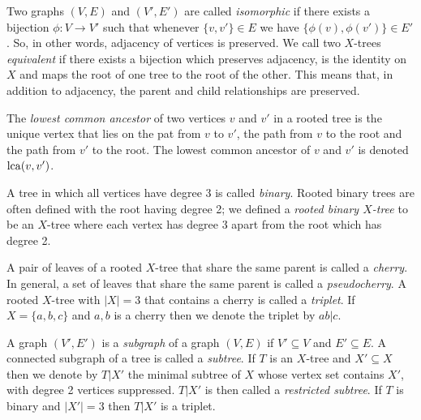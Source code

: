 Two graphs $(V,E)$ and $(V',E')$ are called \textit{isomorphic} if there
exists a bijection $\phi \colon V \to V'$ such that whenever $\{v,v'\} \in E$
we have $\{\phi(v),\phi(v')\} \in E'$.  So, in other words, adjacency of
vertices is preserved.  We call two $X$-trees \textit{equivalent} if there
exists a bijection which preserves adjacency, is the identity on $X$ and maps
the root of one tree to the root of the other.  This means that, in addition
to adjacency, the parent and child relationships are preserved.

The \textit{lowest common ancestor} of two vertices $v$ and $v'$ in a rooted
tree is the unique vertex that lies on the pat from $v$ to $v'$, the path from
$v$ to the root and the path from $v'$ to the root.  The lowest common
ancestor of $v$ and $v'$ is denoted $\operatorname{lca}(v,v')$.

A tree in which all vertices have degree 3 is called \textit{binary}.  Rooted
binary trees are often defined with the root having degree 2; we defined a
\textit{rooted binary $X$-tree} to be an $X$-tree where each vertex has degree
3 apart from the root which has degree 2.

A pair of leaves of a rooted $X$-tree that share the same parent is called a
\textit{cherry}.  In general, a set of leaves that share the same parent is
called a \textit{pseudocherry}.  A rooted $X$-tree with $|X| = 3$ that
contains a cherry is called a \textit{triplet}.  If $X = \{a,b,c\}$ and $a,b$
is a cherry then we denote the triplet by $ab|c$.

A graph $(V',E')$ is a \textit{subgraph} of a graph $(V,E)$ if $V' \subseteq
V$ and $E' \subseteq E$.  A connected subgraph of a tree is called a
\textit{subtree}.  If $T$ is an $X$-tree and $X' \subseteq X$ then we denote
by $T|X'$ the minimal subtree of $X$ whose vertex set contains $X'$, with
degree 2 vertices suppressed.  $T|X'$ is then called a \textit{restricted
  subtree}.  If $T$ is binary and $|X'| = 3$ then $T|X'$ is a triplet.

